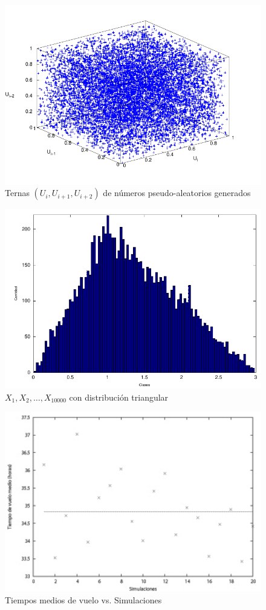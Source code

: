 \documentclass{sig-alternate}
\begin{document}
\begin{figure}[hp]
\centering
\includegraphics[scale=0.8]{graficos/ternas}
\caption{Ternas $(U_{i}, U_{i+1}, U_{i+2})$ de n\'{u}meros pseudo-aleatorios
generados}
\label{fig:ternas}
\end{figure}

\begin{figure}[hp]
\centering
\includegraphics[scale=0.8]{graficos/triangular}
\caption{$X_{1}, X_{2}, \dots, X_{10000}$ con distribuci\'{o}n triangular}
\label{fig:triangular}
\end{figure}

\begin{figure}[hp]
\centering
\includegraphics[scale=0.8]{graficos/tiemposvuelo}
\caption{Tiempos medios de vuelo vs. Simulaciones}
\label{fig:warp}
\end{figure}
\end{document}
